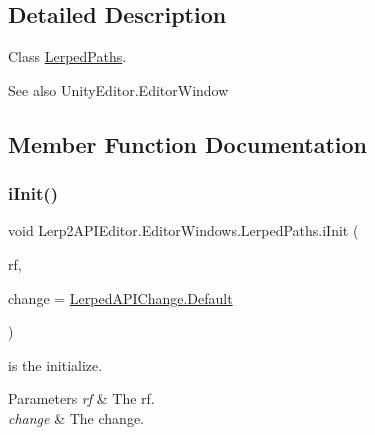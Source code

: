 \subsection{Detailed Description}
Class \hyperlink{class_lerp2_a_p_i_editor_1_1_editor_windows_1_1_lerped_paths}{Lerped\+Paths}. 

\begin{DoxySeeAlso}{See also}
Unity\+Editor.\+Editor\+Window


\end{DoxySeeAlso}


\subsection{Member Function Documentation}
\mbox{\label{class_lerp2_a_p_i_editor_1_1_editor_windows_1_1_lerped_paths_a7ff1e54adacf9f29a9bacd78f1c9d6ae}} 
\subsubsection{\texorpdfstring{i\+Init()}{iInit()}}
{\footnotesize\ttfamily void Lerp2\+A\+P\+I\+Editor.\+Editor\+Windows.\+Lerped\+Paths.\+i\+Init (\begin{DoxyParamCaption}\item[{\hyperlink{class_lerp2_a_p_i_editor_1_1_editor_windows_1_1_lerped_paths}{Lerped\+Paths}}]{rf,  }\item[{\hyperlink{namespace_lerp2_a_p_i_editor_1_1_editor_windows_a7ebc015ae3bb1313ff6c2ba392ffe72c}{Lerped\+A\+P\+I\+Change}}]{change = {\ttfamily \hyperlink{namespace_lerp2_a_p_i_editor_1_1_editor_windows_a7ebc015ae3bb1313ff6c2ba392ffe72ca7a1920d61156abc05a60135aefe8bc67}{Lerped\+A\+P\+I\+Change.\+Default}} }\end{DoxyParamCaption})\hspace{0.3cm}{\ttfamily [inline]}}



is the initialize. 


\begin{DoxyParams}{Parameters}
{\em rf} & The rf.\\
\hline
{\em change} & The change.\\
\hline
\end{DoxyParams}


